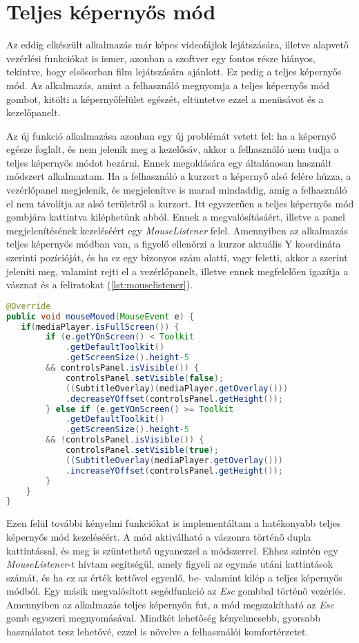 \section{Teljes képernyős mód}

Az eddig elkészült alkalmazás már képes videofájlok lejátszására, illetve alapvető vezérlési funkciókat is ismer, azonban a szoftver egy fontos része hiányos, tekintve, hogy elsősorban film lejátszására ajánlott. Ez pedig a teljes képernyős mód. Az alkalmazás, amint a felhasználó megnyomja a teljes képernyős mód gombot, kitölti a képernyőfelület egészét, eltüntetve ezzel a menüsávot és a kezelőpanelt.

Az új funkció alkalmazása azonban egy új problémát vetett fel: ha a képernyő egésze foglalt, és nem jelenik meg a kezelősáv, akkor a felhasználó nem tudja a teljes képernyős módot bezárni. Ennek megoldására egy általánosan használt módszert alkalmaztam. Ha a felhasználó a kurzort a képernyő alsó felére húzza, a vezérlőpanel megjelenik, és megjelenítve is marad mindaddig, amíg a felhasználó el nem távolítja az alsó területről a kurzort. Itt egyszerűen a teljes képernyős mód gombjára kattintva kiléphetünk abból. Ennek a megvalósításáért, illetve a panel megjelenítésének kezeléséért egy \textit{MouseListener} felel. Amennyiben az alkalmazás teljes képernyős módban van, a figyelő ellenőrzi a kurzor aktuális Y koordináta szerinti pozícióját, és ha ez egy bizonyos szám alatti, vagy feletti, akkor a szerint jeleníti meg, valamint rejti el a vezérlőpanelt, illetve ennek megfelelően igazítja a vásznat és a feliratokat (\ref{lst:mouselistener}).

\begin{lstlisting}[caption=A \textit{MouseListener} megvalósítása, label={lst:mouselistener}, language=java]
@Override
public void mouseMoved(MouseEvent e) {
   if(mediaPlayer.isFullScreen()) {
        if (e.getYOnScreen() < Toolkit
            .getDefaultToolkit()
            .getScreenSize().height-5
        && controlsPanel.isVisible()) {
            controlsPanel.setVisible(false);
            ((SubtitleOverlay)(mediaPlayer.getOverlay()))
            .decreaseYOffset(controlsPanel.getHeight());
        } else if (e.getYOnScreen() >= Toolkit
            .getDefaultToolkit()
            .getScreenSize().height-5
        && !controlsPanel.isVisible()) {
            controlsPanel.setVisible(true);
            ((SubtitleOverlay(mediaPlayer.getOverlay()))
            .increaseYOffset(controlsPanel.getHeight());
        }
    }
}
\end{lstlisting}

Ezen felül további kényelmi funkciókat is implementáltam a hatékonyabb teljes képernyős mód kezeléséért. A mód aktiválható a vászonra történő dupla kattintással, és meg is szüntethető ugyanezzel a módszerrel. Ehhez szintén egy \textit{MouseListener}-t hívtam segítségül, amely figyeli az egymás utáni kattintások számát, és ha ez az érték kettővel egyenlő, be- valamint kilép a teljes képernyős módból. Egy másik megvalósított segédfunkció az \textit{Esc} gombbal történő vezérlés. Amennyiben az alkalmazás teljes képernyőn fut, a mód megszakítható az \textit{Esc} gomb egyszeri megnyomásával. Mindkét lehetőség kényelmesebb, gyorsabb használatot tesz lehetővé, ezzel is növelve a felhasználói komfortérzetet.

